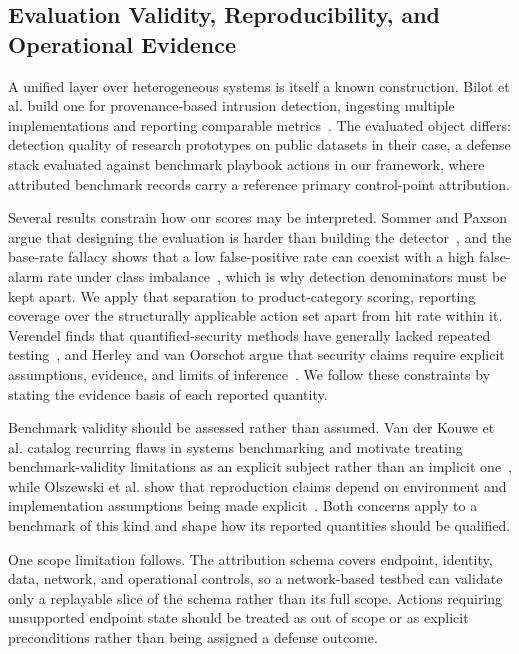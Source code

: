 \subsection{Evaluation Validity, Reproducibility, and Operational Evidence}
\label{subsec:rw-validity}

A unified layer over heterogeneous systems is itself a known construction. Bilot et al. build one for provenance-based intrusion detection, ingesting multiple implementations and reporting comparable metrics~\cite{bilot2025simpler}. The evaluated object differs: detection quality of research prototypes on public datasets in their case, a defense stack evaluated against benchmark playbook actions in our framework, where attributed benchmark records carry a reference primary control-point attribution.

Several results constrain how our scores may be interpreted. Sommer and Paxson argue that designing the evaluation is harder than building the detector~\cite{sommer2010closedworld}, and the base-rate fallacy shows that a low false-positive rate can coexist with a high false-alarm rate under class imbalance~\cite{axelsson2000baserate}, which is why detection denominators must be kept apart. We apply that separation to product-category scoring, reporting coverage over the structurally applicable action set apart from hit rate within it. Verendel finds that quantified-security methods have generally lacked repeated testing~\cite{verendel2009quantified}, and Herley and van Oorschot argue that security claims require explicit assumptions, evidence, and limits of inference~\cite{herley2017science}. We follow these constraints by stating the evidence basis of each reported quantity.

Benchmark validity should be assessed rather than assumed. Van der Kouwe et al. catalog recurring flaws in systems benchmarking and motivate treating benchmark-validity limitations as an explicit subject rather than an implicit one~\cite{vanderkouwe2019benchmarkingflaws}, while Olszewski et al. show that reproduction claims depend on environment and implementation assumptions being made explicit~\cite{olszewski2025replicability}. Both concerns apply to a benchmark of this kind and shape how its reported quantities should be qualified.

One scope limitation follows. The attribution schema covers endpoint, identity, data, network, and operational controls, so a network-based testbed can validate only a replayable slice of the schema rather than its full scope. Actions requiring unsupported endpoint state should be treated as out of scope or as explicit preconditions rather than being assigned a defense outcome.


